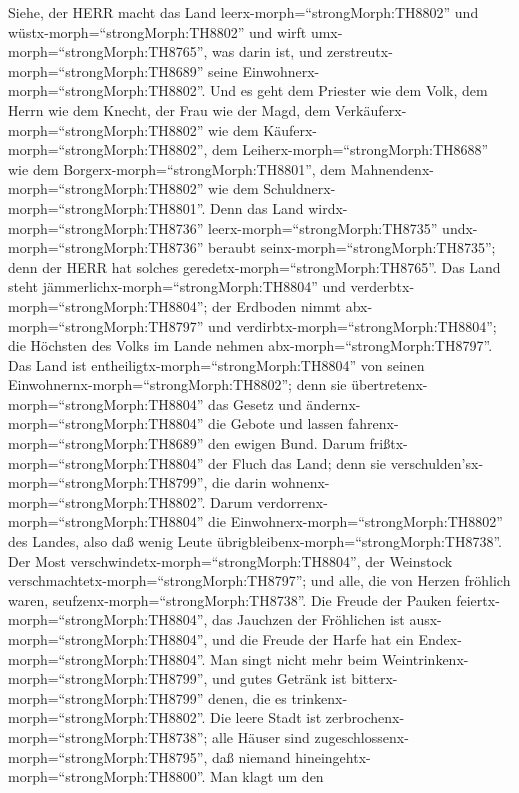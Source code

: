  Siehe, der HERR macht das Land
leerx-morph=``strongMorph:TH8802'' und
wüstx-morph=``strongMorph:TH8802'' und wirft
umx-morph=``strongMorph:TH8765'', was darin ist, und
zerstreutx-morph=``strongMorph:TH8689'' seine
Einwohnerx-morph=``strongMorph:TH8802''.  Und es geht dem
Priester wie dem Volk, dem Herrn wie dem Knecht, der Frau wie der Magd,
dem Verkäuferx-morph=``strongMorph:TH8802'' wie dem
Käuferx-morph=``strongMorph:TH8802'', dem
Leiherx-morph=``strongMorph:TH8688'' wie dem
Borgerx-morph=``strongMorph:TH8801'', dem
Mahnendenx-morph=``strongMorph:TH8802'' wie dem
Schuldnerx-morph=``strongMorph:TH8801''.  Denn das Land
wirdx-morph=``strongMorph:TH8736'' leerx-morph=``strongMorph:TH8735''
undx-morph=``strongMorph:TH8736'' beraubt
seinx-morph=``strongMorph:TH8735''; denn der HERR hat solches
geredetx-morph=``strongMorph:TH8765''.  Das Land steht
jämmerlichx-morph=``strongMorph:TH8804'' und
verderbtx-morph=``strongMorph:TH8804''; der Erdboden nimmt
abx-morph=``strongMorph:TH8797'' und
verdirbtx-morph=``strongMorph:TH8804''; die Höchsten des Volks im Lande
nehmen abx-morph=``strongMorph:TH8797''.  Das Land ist
entheiligtx-morph=``strongMorph:TH8804'' von seinen
Einwohnernx-morph=``strongMorph:TH8802''; denn sie
übertretenx-morph=``strongMorph:TH8804'' das Gesetz und
ändernx-morph=``strongMorph:TH8804'' die Gebote und lassen
fahrenx-morph=``strongMorph:TH8689'' den ewigen Bund.  Darum
frißtx-morph=``strongMorph:TH8804'' der Fluch das Land; denn sie
verschulden'sx-morph=``strongMorph:TH8799'', die darin
wohnenx-morph=``strongMorph:TH8802''. Darum
verdorrenx-morph=``strongMorph:TH8804'' die
Einwohnerx-morph=``strongMorph:TH8802'' des Landes, also daß wenig Leute
übrigbleibenx-morph=``strongMorph:TH8738''.  Der Most
verschwindetx-morph=``strongMorph:TH8804'', der Weinstock
verschmachtetx-morph=``strongMorph:TH8797''; und alle, die von Herzen
fröhlich waren, seufzenx-morph=``strongMorph:TH8738''.  Die
Freude der Pauken feiertx-morph=``strongMorph:TH8804'', das Jauchzen der
Fröhlichen ist ausx-morph=``strongMorph:TH8804'', und die Freude der
Harfe hat ein Endex-morph=``strongMorph:TH8804''.  Man singt
nicht mehr beim Weintrinkenx-morph=``strongMorph:TH8799'', und gutes
Getränk ist bitterx-morph=``strongMorph:TH8799'' denen, die es
trinkenx-morph=``strongMorph:TH8802''.  Die leere Stadt ist
zerbrochenx-morph=``strongMorph:TH8738''; alle Häuser sind
zugeschlossenx-morph=``strongMorph:TH8795'', daß niemand
hineingehtx-morph=``strongMorph:TH8800''.  Man klagt um den
